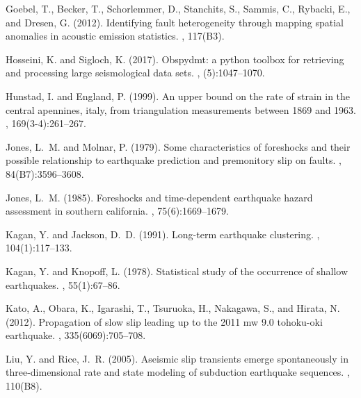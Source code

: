 \documentclass[a4paper,12pt,twoside]{article}
\begin{document}
\begin{thebibliography}{}
Goebel, T., Becker, T., Schorlemmer, D., Stanchits, S., Sammis, C., Rybacki,
  E., and Dresen, G. (2012).
\newblock Identifying fault heterogeneity through mapping spatial anomalies in
  acoustic emission statistics.
, 117(B3).

Hosseini, K. and Sigloch, K. (2017).
\newblock Obspydmt: a python toolbox for retrieving and processing large
  seismological data sets.
, (5):1047--1070.

Hunstad, I. and England, P. (1999).
\newblock An upper bound on the rate of strain in the central apennines, italy,
  from triangulation measurements between 1869 and 1963.
, 169(3-4):261--267.

Jones, L.~M. and Molnar, P. (1979).
\newblock Some characteristics of foreshocks and their possible relationship to
  earthquake prediction and premonitory slip on faults.
,
  84(B7):3596--3608.

Jones, L.~M. (1985).
\newblock Foreshocks and time-dependent earthquake hazard assessment in
  southern california.
,
  75(6):1669--1679.

Kagan, Y. and Jackson, D.~D. (1991).
\newblock Long-term earthquake clustering.
, 104(1):117--133.

Kagan, Y. and Knopoff, L. (1978).
\newblock Statistical study of the occurrence of shallow earthquakes.
, 55(1):67--86.
  
Kato, A., Obara, K., Igarashi, T., Tsuruoka, H., Nakagawa, S., and Hirata, N.
  (2012).
\newblock Propagation of slow slip leading up to the 2011 mw 9.0 tohoku-oki
  earthquake.
, 335(6069):705--708.

Liu, Y. and Rice, J.~R. (2005).
\newblock Aseismic slip transients emerge spontaneously in three-dimensional
  rate and state modeling of subduction earthquake sequences.
, 110(B8).


\end{thebibliography}
\end{document}
